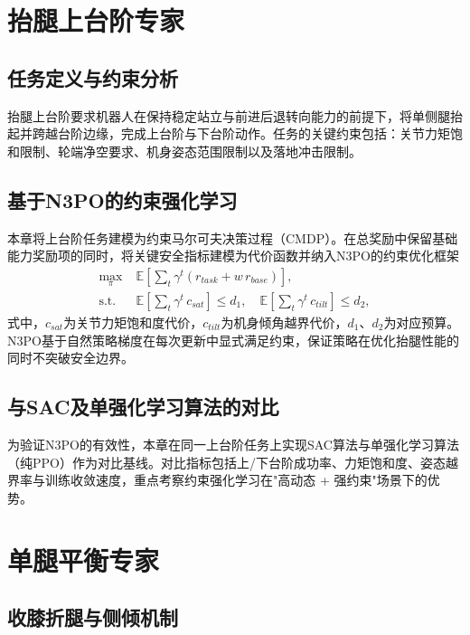 \section{抬腿上台阶专家}

\subsection{任务定义与约束分析}

抬腿上台阶要求机器人在保持稳定站立与前进后退转向能力的前提下，将单侧腿抬起并跨越台阶边缘，完成上台阶与下台阶动作。任务的关键约束包括：关节力矩饱和限制、轮端净空要求、机身姿态范围限制以及落地冲击限制。

\subsection{基于N3PO的约束强化学习}

本章将上台阶任务建模为约束马尔可夫决策过程（CMDP）。在总奖励中保留基础能力奖励项的同时，将关键安全指标建模为代价函数并纳入N3PO的约束优化框架
\begin{equation}
  \begin{aligned}
    \max_{\pi}\;&\mathbb{E}\left[\sum_t \gamma^t\left(r_{task} + w\,r_{base}\right)\right],\\
    \text{s.t.}\;&\mathbb{E}\left[\sum_t \gamma^t\, c_{sat}\right] \le d_1,\quad
    \mathbb{E}\left[\sum_t \gamma^t\, c_{tilt}\right] \le d_2,
  \end{aligned}
  \label{eq:n3po-cmdp}
\end{equation}
式中，$c_{sat}$为关节力矩饱和度代价，$c_{tilt}$为机身倾角越界代价，$d_1$、$d_2$为对应预算。N3PO基于自然策略梯度在每次更新中显式满足约束，保证策略在优化抬腿性能的同时不突破安全边界。

\subsection{与SAC及单强化学习算法的对比}

为验证N3PO的有效性，本章在同一上台阶任务上实现SAC算法与单强化学习算法（纯PPO）作为对比基线。对比指标包括上/下台阶成功率、力矩饱和度、姿态越界率与训练收敛速度，重点考察约束强化学习在"高动态 + 强约束"场景下的优势。

\section{单腿平衡专家}

\subsection{收膝折腿与侧倾机制}

